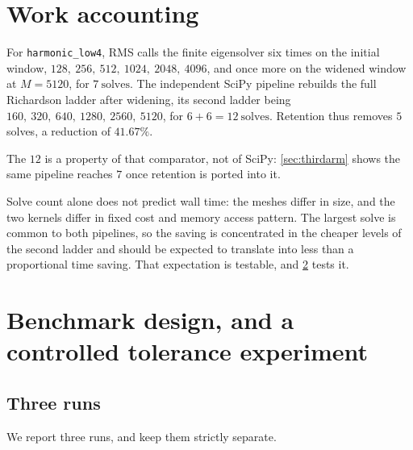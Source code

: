 \documentclass[twocolumn,10pt,a4paper]{article}
\theoremstyle{plain}
\theoremstyle{definition}
\begin{document}
\section{Work accounting}
\label{sec:work}

\begin{sloppypar}
For \texttt{harmonic\_low4}, RMS calls the finite eigensolver six times on the
initial window, $128,\ 256,\ 512,\ 1024,\ 2048,\ 4096$, and once more on the
widened window at $M = 5120$, for $\boxed{7\ \text{solves}}$. The independent
SciPy pipeline rebuilds the full Richardson ladder after widening, its second
ladder being $160,\ 320,\ 640,\ 1280,\ 2560,\ 5120$, for
$6 + 6 = \boxed{12\ \text{solves}}$. Retention thus removes $5$ solves, a
reduction of $41.67\%$.
\end{sloppypar}

The $12$ is a property of that comparator, not of SciPy: \cref{sec:thirdarm}
shows the same pipeline reaches $7$ once retention is ported into it.

Solve count alone does not predict wall time: the meshes differ in size, and the
two kernels differ in fixed cost and memory access pattern. The largest solve is
common to both pipelines, so the saving is concentrated in the cheaper levels of
the second ladder and should be expected to translate into less than a
proportional time saving. That expectation is testable, and \cref{sec:bench}
tests it.

\section{Benchmark design, and a controlled tolerance experiment}
\label{sec:bench}

\subsection{Three runs}

We report three runs, and keep them strictly separate.
\end{document}
